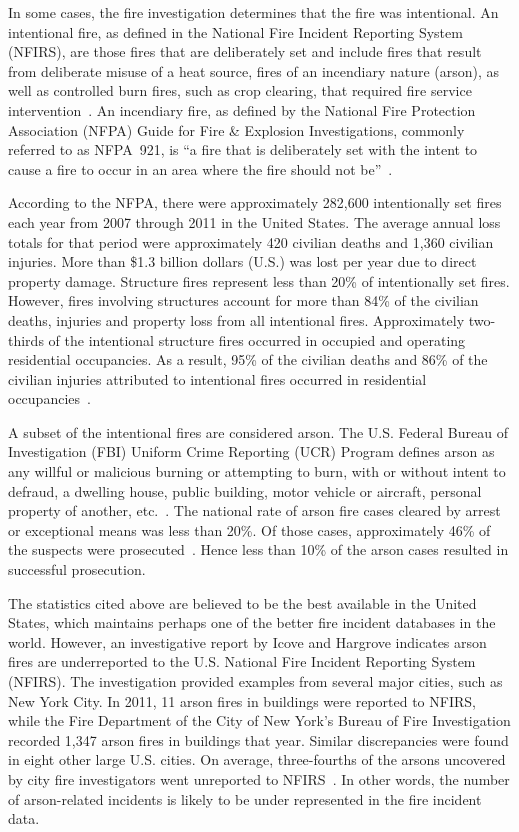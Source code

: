\documentclass[twoside]{uocthesis}
\begin{document}
In some cases, the fire investigation determines that the fire was intentional.  An intentional fire, as defined in the National Fire Incident Reporting System (NFIRS), are those fires that are deliberately set and include fires that result from deliberate misuse of a heat source, fires of an incendiary nature (arson), as well as controlled burn fires, such as crop clearing, that required fire service intervention~\cite{Campbell:2014}.  An incendiary fire, as defined by the National Fire Protection Association (NFPA) Guide for Fire \& Explosion Investigations, commonly referred to as NFPA~921, is ``a fire that is deliberately set with the intent to cause a fire to occur in an area where the fire should not be''~\cite{NFPA:921}.

According to the NFPA, there were approximately 282,600 intentionally set fires each year from 2007 through 2011 in the United States. The average annual loss totals for that period were approximately 420 civilian deaths and 1,360 civilian injuries. More than \$1.3 billion dollars (U.S.) was lost per year due to direct property damage. Structure fires represent less than 20\% of intentionally set fires.  However, fires involving structures account for more than 84\% of the civilian deaths, injuries and property loss from all intentional fires.  Approximately two-thirds of the intentional structure fires occurred in occupied and operating residential occupancies.  As a result, 95\% of the civilian deaths and 86\% of the civilian injuries attributed to intentional fires occurred in residential occupancies~\cite{Campbell:2014}.

A subset of the intentional fires are considered arson.  The U.S. Federal Bureau of Investigation (FBI) Uniform Crime Reporting (UCR) Program defines arson as any willful or malicious burning or attempting to burn, with or without intent to defraud, a dwelling house, public building, motor vehicle or aircraft, personal property of another, etc.~\cite{Crime:2010}.  The national rate of arson fire cases cleared by arrest or exceptional means was less than 20\%.  Of those cases, approximately 46\% of the suspects were prosecuted~\cite{Campbell:2014}.  Hence less than 10\% of the arson cases resulted in successful prosecution.   

The statistics cited above are believed to be the best available in the United States, which maintains perhaps one of the better fire incident databases in the world.  However, an investigative report by Icove and Hargrove indicates arson fires are underreported to the U.S. National Fire Incident Reporting System (NFIRS).  The investigation provided examples from several major cities, such as New York City. In 2011, 11 arson fires in buildings were reported to NFIRS, while the Fire Department of the City of New York's Bureau of Fire Investigation recorded 1,347 arson fires in buildings that year.  Similar discrepancies were found in eight other large U.S. cities.  On average, three-fourths of the arsons uncovered by city fire investigators went unreported to NFIRS~\cite{Icove_2014}.  In other words, the number of arson-related incidents is likely to be under represented in the fire incident data.  
\end{document}
